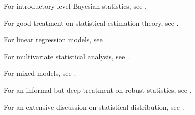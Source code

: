 \begin{refsection}
For introductory level Bayesian statistics, see \cite{hoff2009first}.

For good treatment on statistical estimation theory, see \cite{kay1993fundamentals}.


For linear regression models, see \cite{kutner2003applied}\cite{seber2012linear}.

For multivariate statistical analysis, see \cite{johnson2007applied}.

For mixed models, see \cite{mcculloch2001generalized}.

For an informal but deep treatment on robust statistics, see \cite{wilcox2010fundamentals}.

For an extensive discussion on statistical distribution, see \cite{forbes2011statistical}\cite{krishnamoorthy2016handbook}.

\printbibliography
\end{refsection}

